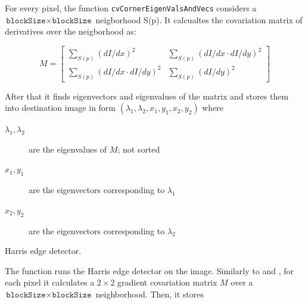 For every pixel, the function \texttt{cvCornerEigenValsAndVecs} considers a $\texttt{blockSize} \times \texttt{blockSize}$ neigborhood S(p). It calcualtes the covariation matrix of derivatives over the neigborhood as:

\[
M = \begin{bmatrix}
\sum_{S(p)}(dI/dx)^2 & \sum_{S(p)}(dI/dx \cdot dI/dy)^2 \\
\sum_{S(p)}(dI/dx \cdot dI/dy)^2 & \sum_{S(p)}(dI/dy)^2
\end{bmatrix}
\]

After that it finds eigenvectors and eigenvalues of the matrix and stores them into destination image in form
$(\lambda_1, \lambda_2, x_1, y_1, x_2, y_2)$ where
\begin{description}
\item[$\lambda_1, \lambda_2$]are the eigenvalues of $M$; not sorted
\item[$x_1, y_1$]are the eigenvectors corresponding to $\lambda_1$
\item[$x_2, y_2$]are the eigenvectors corresponding to $\lambda_2$
\end{description}

Harris edge detector.


\begin{description}
\end{description}

The function runs the Harris edge detector on the image. Similarly to  and , for each pixel it calculates a $2\times2$ gradient covariation matrix $M$ over a $\texttt{blockSize} \times \texttt{blockSize}$ neighborhood. Then, it stores

